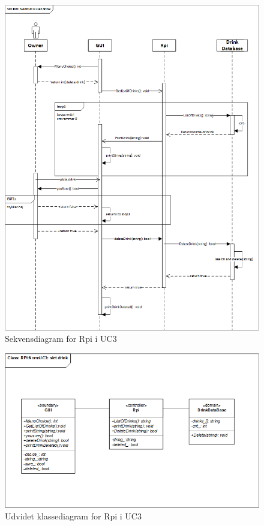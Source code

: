 \begin{figure}[H]
    \centering
    \includegraphics[width=1\textwidth]{Images/Applikationsmodeller/rpi/rpi_sekvensdiagramNormUC3.png}
    \caption{Sekvensdiagram for Rpi i UC3}
    \label{fig:SdUC3Rpi}
\end{figure}

\begin{figure}[H]
    \centering
    \includegraphics[width=1\textwidth]{Images/Applikationsmodeller/rpi/rpi_UdvidetklassediagramNormUC3.png}
    \caption{Udvidet klassediagram for Rpi i UC3}
    \label{fig:UcdUC3Rpi}
\end{figure}

